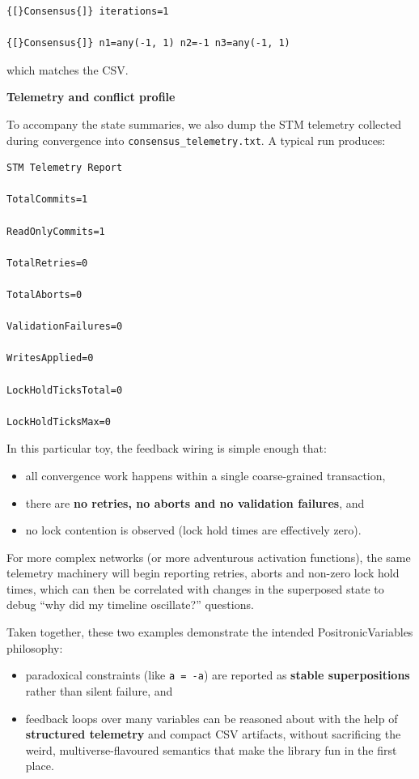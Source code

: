 \documentclass[a4paper,11pt]{article}
\begin{document}
\begin{lstlisting}[style=datadumpnofloat]
{[}Consensus{]} iterations=1

{[}Consensus{]} n1=any(-1, 1) n2=-1 n3=any(-1, 1)
\end{lstlisting}

which matches the CSV.

\textbf{Telemetry and conflict profile}

To accompany the state summaries, we also dump the STM telemetry collected during convergence into \texttt{consensus\_telemetry.txt}. A typical run produces:

\begin{lstlisting}[style=datadumpnofloat]
STM Telemetry Report

TotalCommits=1

ReadOnlyCommits=1

TotalRetries=0

TotalAborts=0

ValidationFailures=0

WritesApplied=0

LockHoldTicksTotal=0

LockHoldTicksMax=0
\end{lstlisting}

In this particular toy, the feedback wiring is simple enough that:

\begin{itemize}
\item
  all convergence work happens within a single coarse-grained transaction,
\item
  there are \textbf{no retries, no aborts and no validation failures}, and
\item
  no lock contention is observed (lock hold times are effectively zero).
\end{itemize}

For more complex networks (or more adventurous activation functions), the same telemetry machinery will begin reporting retries, aborts and non-zero lock hold times, which can then be correlated with changes in the superposed state to debug ``why did my timeline oscillate?'' questions.

Taken together, these two examples demonstrate the intended PositronicVariables philosophy:

\begin{itemize}
\item
  paradoxical constraints (like \texttt{a = -a}) are reported as \textbf{stable superpositions} rather than silent failure, and
\item
  feedback loops over many variables can be reasoned about with the help of \textbf{structured telemetry} and compact CSV artifacts, without sacrificing the weird, multiverse-flavoured semantics that make the library fun in the first place.
\end{itemize}
\end{document}
